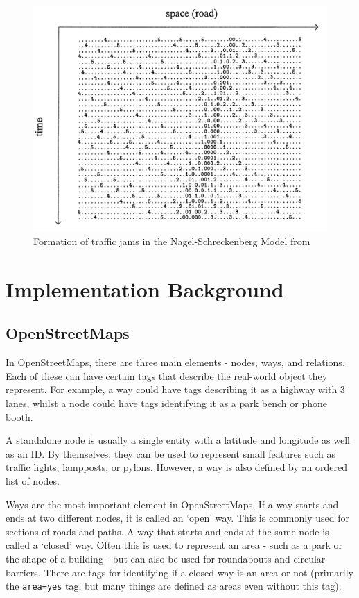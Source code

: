 \documentclass[ %
                    author={Alexander Hill},
                supervisor={Dr. Benjamin Sach},
                    degree={MEng},
                     title={MARMOSET},
                  subtitle={Multi-Agent Route Management using Online Simulation for Efficient Transportation},
                      type={research},
                      year={2016} ]{dissertation}
\begin{document}
\begin{figure}[h]
    \centering
    \includegraphics[scale=0.4]{nagel}
    \caption{Formation of traffic jams in the Nagel-Schreckenberg Model
    from~\cite{nagel}}\label{nagel-demo}
\end{figure}

\section{Implementation Background}\label{sec:tech-impl}

\subsection{OpenStreetMaps}

In OpenStreetMaps, there are three main elements - nodes, ways, and relations.
Each of these can have certain tags that describe the real-world object they
represent. For example, a way could have tags describing it as a highway with 3
lanes, whilst a node could have tags identifying it as a park bench or phone
booth.

A standalone node is usually a single entity with a latitude and longitude as
well as an ID. By themselves, they can be used to represent small features such
as traffic lights, lampposts, or pylons. However, a way is also defined by an
ordered list of nodes.

Ways are the most important element in OpenStreetMaps. If a way starts and ends
at two different nodes, it is called an `open' way. This is commonly used for
sections of roads and paths. A way that starts and ends at the same node is
called a `closed' way. Often this is used to represent an area - such as a park
or the shape of a building - but can also be used for roundabouts and circular
barriers. There are tags for identifying if a closed way is an area or not
(primarily the \texttt{area=yes} tag, but many things are defined as areas even
without this tag).
\end{document}
